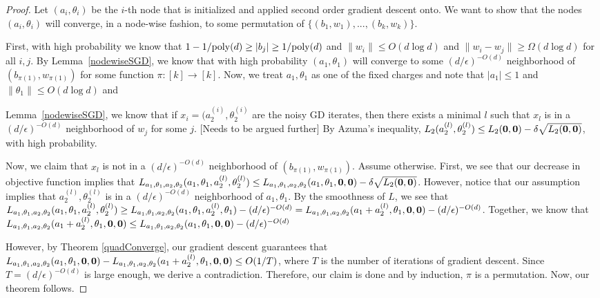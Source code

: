 \begin{proof}
Let $(a_i, \theta_i)$ be the $i$-th node that is initialized and applied second order gradient descent onto. We want to show that the nodes $(a_i, \theta_i)$ will converge, in a node-wise fashion, to some permutation of $\{(b_1,w_1),...,(b_k,w_k)\}$. 

First, with high probability we know that $1 - 1/\mathrm{poly}(d) \geq |b_j| \geq 1/\mathrm{poly}(d)$ and $\|w_i\|\leq O(d\log d)$ and $\|w_i - w_j \| \geq \Omega(d\log d)$ for all $i, j$. By Lemma~\ref{nodewiseSGD}, we know that with high probability $(a_1,\theta_1)$ will converge to some $(d/\epsilon)^{-O(d)}$ neighborhood of $(b_{\pi(1)}, w_{\pi(1)})$ for some function $\pi: [k] \to [k]$. Now, we treat $a_1, \theta_1$ as one of the fixed charges and note that $|a_1| \leq 1$ and $\|\theta_1\| \leq O(d\log d)$ and 


Lemma~\ref{nodewiseSGD}, we know that if $x_i = (a_2^{(i)}, \theta_2^{(i)}$ are the noisy GD iterates, then there exists a minimal $l$ such that $x_l$ is in a $(d/\epsilon)^{-O(d)}$ neighborhood of $w_j$ for some $j$. [Needs to be argued further] By Azuma's inequality, $L_2({a_2^{(l)},\theta_2^{(l)}}) \leq  L_2({\bf 0,0}) - \delta \sqrt{L_2({\bf 0,0})}$, with high probability. 

Now, we claim that $x_l$ is not in a $(d/\epsilon)^{-O(d)}$ neighborhood of $(b_{\pi(1)}, w_{\pi(1)})$. Assume otherwise. First, we see that our decrease in objective function implies that $L_{a_1,\theta_1,a_2,\theta_2}(a_1,\theta_1, a_2^{(l)},\theta_2^{(l)}) \leq L_{a_1,\theta_1,a_2,\theta_2}(a_1,\theta_1, {\bf 0,0}) - \delta \sqrt{L_2({\bf 0,0})}$. However, notice that our assumption implies that $a_2^{(l)},\theta_2^{(l)}$ is in a $(d/\epsilon)^{-O(d)}$ neighborhood of $a_1,\theta_1$. By the smoothness of $L$, we see that $L_{a_1,\theta_1,a_2,\theta_2}(a_1,\theta_1, a_2^{(l)},\theta_2^{(l)}) \geq L_{a_1,\theta_1,a_2,\theta_2}(a_1,\theta_1, a_2^{(l)},\theta_1) - (d/\epsilon)^{-O(d)} = L_{a_1,\theta_1,a_2,\theta_2}(a_1 + a_2^{(l)},\theta_1, {\bf 0, 0}) - (d/\epsilon)^{-O(d)} $. Together, we know that  $L_{a_1,\theta_1,a_2,\theta_2}(a_1+a_2^{(l)},\theta_1,{\bf 0, 0}) \leq L_{a_1,\theta_1,a_2,\theta_2}(a_1,\theta_1, {\bf 0,0}) - (d/\epsilon)^{-O(d)}$

However, by Theorem \ref{quadConverge}, our gradient descent guarantees that $L_{a_1,\theta_1,a_2,\theta_2}(a_1,\theta_1, {\bf 0,0}) - L_{a_1,\theta_1,a_2,\theta_2}(a_1 + a_2^{(l)},\theta_1, {\bf 0, 0}) \leq O(1/T)$, where $T$ is the number of iterations of gradient descent. Since $T = (d/\epsilon)^{-O(d)}$ is large enough, we derive a contradiction. Therefore, our claim is done and by induction, $\pi$ is a permutation. Now, our theorem follows. 
\end{proof}

